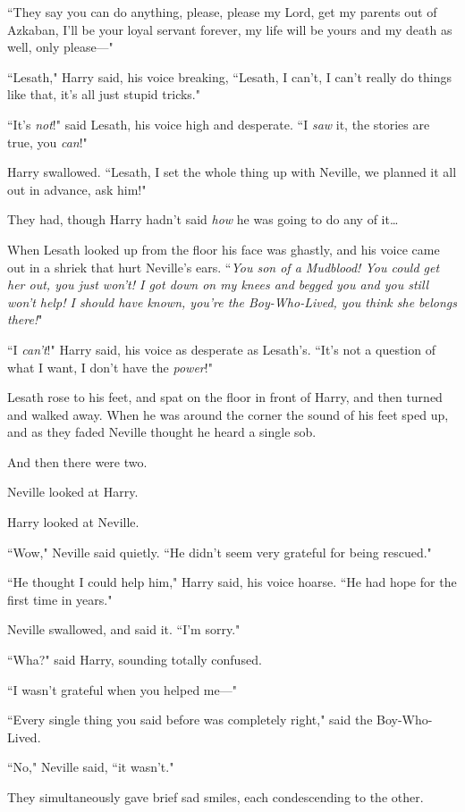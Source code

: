 ``They say you can do anything, please, please my Lord, get my parents out of Azkaban, I'll be your loyal servant forever, my life will be yours and my death as well, only please---"

``Lesath," Harry said, his voice breaking, ``Lesath, I can't, I can't really do things like that, it's all just stupid tricks."

``It's \emph{not}!" said Lesath, his voice high and desperate. ``I \emph{saw} it, the stories are true, you \emph{can}!"

Harry swallowed. ``Lesath, I set the whole thing up with Neville, we planned it all out in advance, ask him!"

They had, though Harry hadn't said \emph{how} he was going to do any of it{\ldots}

When Lesath looked up from the floor his face was ghastly, and his voice came out in a shriek that hurt Neville's ears. ``\emph{You son of a Mudblood! You could get her out, you just won't! I got down on my knees and begged you and you still won't help! I should have known, you're the Boy-Who-Lived, you think she belongs there!}"

``I \emph{can't}!" Harry said, his voice as desperate as Lesath's. ``It's not a question of what I want, I don't have the \emph{power}!"

Lesath rose to his feet, and spat on the floor in front of Harry, and then turned and walked away. When he was around the corner the sound of his feet sped up, and as they faded Neville thought he heard a single sob.

And then there were two.

Neville looked at Harry.

Harry looked at Neville.

``Wow," Neville said quietly. ``He didn't seem very grateful for being rescued."

``He thought I could help him," Harry said, his voice hoarse. ``He had hope for the first time in years."

Neville swallowed, and said it. ``I'm sorry."

``Wha?" said Harry, sounding totally confused.

``I wasn't grateful when you helped me---"

``Every single thing you said before was completely right," said the Boy-Who-Lived.

``No," Neville said, ``it wasn't."

They simultaneously gave brief sad smiles, each condescending to the other.


